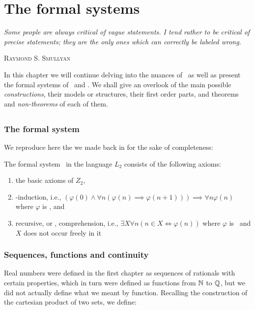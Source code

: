 \documentclass[../main.tex]{memoir}
\begin{document}
\chapter{The formal systems}

\epigraph{
  \textit{
    Some people are always critical of vague statements. I tend rather to be
    critical of precise statements; they are the only ones which can correctly
    be labeled wrong.
  }
}{\textsc{Raymond S. Smullyan}}

In this chapter we will continue delving into the nuances of \rca\ as well as present the formal systems of \wkl\ and \aca. We shall give an overlook of the main possible \textit{constructions}, their models or structures, their first order parts, and theorems and \textit{non-theorems} of each of them.

\section{\rca}

\subsection{The formal system}

We reproduce here the  we made back in  for the sake of completeness:

\begin{definition}
  The formal system \rca\ in the language $L_2$ consists of the following axioms:

  \begin{enumerate}
  \item the basic axioms of $Z_2$,
  \item \re-induction, i.e., $(\varphi(0) \land \forall n (\varphi(n) \implies \varphi(n + 1))) \implies \forall n \varphi(n)$ where $\varphi$ is \re, and
  \item recursive, or \rec, comprehension, i.e., $\exists X \forall n (n \in X \iff \varphi(n))$ where $\varphi$ is \rec\ and $X$ does not occur freely in it
  \end{enumerate}
\end{definition}

\subsection{Sequences, functions and continuity}

Real numbers were defined in the first chapter as sequences of rationals with certain properties, which in turn were defined as functions from $\mathbb{N}$ to $\mathbb{Q}$, but we did not actually define what we meant by function. Recalling the construction of the cartesian product of two sets, we define:
\end{document}
